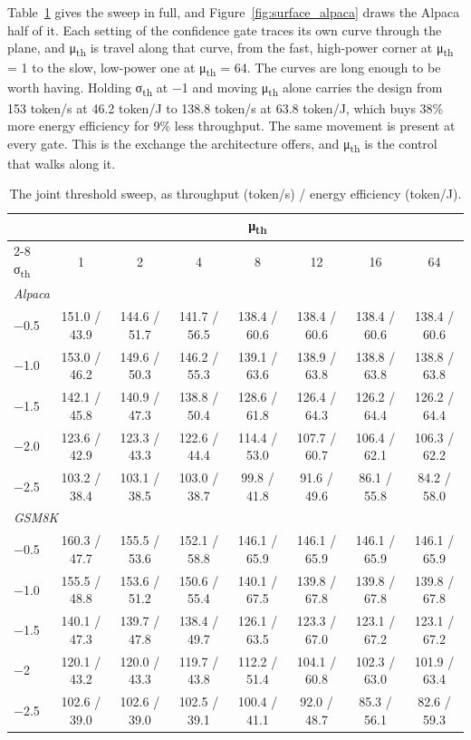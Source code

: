 \documentclass[11pt]{article}
\begin{document}
Table~\ref{tab:surface} gives the sweep in full, and Figure~\ref{fig:surface_alpaca} draws the Alpaca half of it. Each setting of the confidence gate traces its own curve through the plane, and μ\textsubscript{th} is travel along that curve, from the fast, high-power corner at μ\textsubscript{th} = 1 to the slow, low-power one at μ\textsubscript{th} = 64. The curves are long enough to be worth having. Holding σ\textsubscript{th} at −1 and moving μ\textsubscript{th} alone carries the design from 153 token/s at 46.2 token/J to 138.8 token/s at 63.8 token/J, which buys 38\% more energy efficiency for 9\% less throughput. The same movement is present at every gate. This is the exchange the architecture offers, and μ\textsubscript{th} is the control that walks along it.


\begin{table}[H]
\centering
\footnotesize
\setlength{\tabcolsep}{4.5pt}
\begin{tabular}{lccccccc}
\toprule
 & \multicolumn{7}{c}{μ\textsubscript{th}} \\
\cmidrule(lr){2-8}
σ\textsubscript{th} & 1 & 2 & 4 & 8 & 12 & 16 & 64 \\
\midrule
\multicolumn{8}{l}{\emph{Alpaca}} \\
−0.5 & 151.0 / 43.9 & 144.6 / 51.7 & 141.7 / 56.5 & 138.4 / 60.6 & 138.4 / 60.6 & 138.4 / 60.6 & 138.4 / 60.6 \\
−1.0 & 153.0 / 46.2 & 149.6 / 50.3 & 146.2 / 55.3 & 139.1 / 63.6 & 138.9 / 63.8 & 138.8 / 63.8 & 138.8 / 63.8 \\
−1.5 & 142.1 / 45.8 & 140.9 / 47.3 & 138.8 / 50.4 & 128.6 / 61.8 & 126.4 / 64.3 & 126.2 / 64.4 & 126.2 / 64.4 \\
−2.0 & 123.6 / 42.9 & 123.3 / 43.3 & 122.6 / 44.4 & 114.4 / 53.0 & 107.7 / 60.7 & 106.4 / 62.1 & 106.3 / 62.2 \\
−2.5 & 103.2 / 38.4 & 103.1 / 38.5 & 103.0 / 38.7 & 99.8 / 41.8 & 91.6 / 49.6 & 86.1 / 55.8 & 84.2 / 58.0 \\
\midrule
\multicolumn{8}{l}{\emph{GSM8K}} \\
−0.5 & 160.3 / 47.7 & 155.5 / 53.6 & 152.1 / 58.8 & 146.1 / 65.9 & 146.1 / 65.9 & 146.1 / 65.9 & 146.1 / 65.9 \\
−1.0 & 155.5 / 48.8 & 153.6 / 51.2 & 150.6 / 55.4 & 140.1 / 67.5 & 139.8 / 67.8 & 139.8 / 67.8 & 139.8 / 67.8 \\
−1.5 & 140.1 / 47.3 & 139.7 / 47.8 & 138.4 / 49.7 & 126.1 / 63.5 & 123.3 / 67.0 & 123.1 / 67.2 & 123.1 / 67.2 \\
−2 & 120.1 / 43.2 & 120.0 / 43.3 & 119.7 / 43.8 & 112.2 / 51.4 & 104.1 / 60.8 & 102.3 / 63.0 & 101.9 / 63.4 \\
−2.5 & 102.6 / 39.0 & 102.6 / 39.0 & 102.5 / 39.1 & 100.4 / 41.1 & 92.0 / 48.7 & 85.3 / 56.1 & 82.6 / 59.3 \\
\bottomrule
\end{tabular}
\caption{The joint threshold sweep, as throughput (token/s) / energy efficiency (token/J).}
\label{tab:surface}
\end{table}
\end{document}
